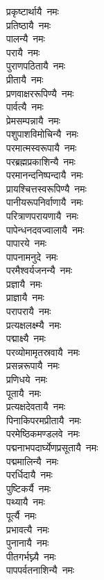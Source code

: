\begin{multicols}{\maxColumns}
\begin{flushleft}
प्रकृष्टार्थायै~नमः\\
प्रतिष्ठायै~नमः\\
पालन्यै~नमः\\
परायै~नमः\\
पुराणपठितायै~नमः\\
प्रीतायै~नमः\\
प्रणवाक्षररूपिण्यै~नमः\\
पार्वत्यै~नमः\\
प्रेमसम्पन्नायै~नमः\hfill{}\\
पशुपाशविमोचिन्यै~नमः\\
परमात्मस्वरूपायै~नमः\\
परब्रह्मप्रकाशिन्यै~नमः\\
परमानन्दनिष्पन्दायै~नमः\\
प्रायश्चित्तस्वरूपिण्यै~नमः\\
पानीयरूपनिर्वाणायै~नमः\\
परित्राणपरायणायै~नमः\\
पापेन्धनदवज्वालायै~नमः\\
पापारये~नमः\\
पापनामनुदे~नमः\hfill{}\\
परमैश्वर्यजनन्यै~नमः\\
प्रज्ञायै~नमः\\
प्राज्ञायै~नमः\\
परापरायै~नमः\\
प्रत्यक्षलक्ष्म्यै~नमः\\
पद्माक्ष्यै~नमः\\
परव्योमामृतस्रवायै~नमः\\
प्रसन्नरूपायै~नमः\\
प्रणिधये~नमः\\
पूतायै~नमः\hfill{}\\
प्रत्यक्षदेवतायै~नमः\\
पिनाकिपरमप्रीतायै~नमः\\
परमेष्ठिकमण्डलवे~नमः\\
पद्मनाभपदार्घ्येणप्रसूतायै~नमः\\
पद्ममालिन्यै~नमः\\
परर्धिदायै~नमः\\
पुष्टिकर्यै~नमः\\
पथ्यायै~नमः\\
पूर्त्यै~नमः\\
प्रभावत्यै~नमः\hfill{}\\
पुनानायै~नमः\\
पीतगर्भघ्न्यै~नमः\\
पापपर्वतनाशिन्यै~नमः\\

\end{flushleft}
\end{multicols}
